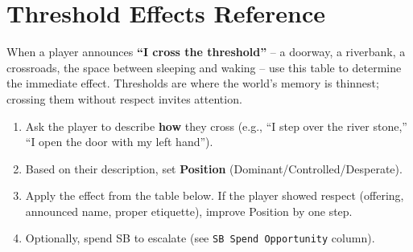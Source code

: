 \section{Threshold Effects Reference}
\label{sec:threshold-effects}

When a player announces \textbf{“I cross the threshold”} – a doorway, a riverbank, a crossroads, the space between sleeping and waking – use this table to determine the immediate effect. Thresholds are where the world’s memory is thinnest; crossing them without respect invites attention.

\begin{tcolorbox}[
  colback=blue!5!white,
  colframe=blue!75!black,
  title=GM Procedure for Threshold Crossings,
  fonttitle=\bfseries
]
\begin{enumerate}
  \item Ask the player to describe \textbf{how} they cross (e.g., “I step over the river stone,” “I open the door with my left hand”).
  \item Based on their description, set \textbf{Position} (Dominant/Controlled/Desperate).
  \item Apply the effect from the table below. If the player showed respect (offering, announced name, proper etiquette), improve Position by one step.
  \item Optionally, spend SB to escalate (see \texttt{SB Spend Opportunity} column).
\end{enumerate}
\end{tcolorbox}

